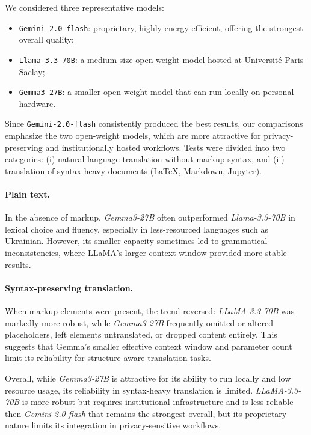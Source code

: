 \documentclass[runningheads]{llncs}
\begin{document}
We considered three representative models:
\begin{itemize}
    \item \texttt{Gemini-2.0-flash}: proprietary, highly energy-efficient,
    offering the strongest overall quality;
    \item \texttt{Llama-3.3-70B}: a medium-size open-weight model hosted at
    Université Paris-Saclay;
    \item \texttt{Gemma3-27B}: a smaller open-weight model that can run locally
    on personal hardware.
\end{itemize}

Since \texttt{Gemini-2.0-flash} consistently produced the best results, our
comparisons emphasize the two open-weight models, which are more attractive for
privacy-preserving and institutionally hosted workflows. Tests were divided
into two categories: (i) natural language translation without markup syntax,
and (ii) translation of syntax-heavy documents (LaTeX, Markdown, Jupyter).

\paragraph{Plain text.}
In the absence of markup, \textit{Gemma3-27B} often outperformed
\textit{Llama-3.3-70B} in lexical choice and fluency, especially in
less-resourced languages such as Ukrainian. However, its smaller capacity
sometimes led to grammatical inconsistencies, where LLaMA’s larger context
window provided more stable results.

\paragraph{Syntax-preserving translation.}
When markup elements were present, the trend reversed: \textit{LLaMA-3.3-70B}
was markedly more robust, while \textit{Gemma3-27B} frequently omitted or
altered placeholders, left elements untranslated, or dropped content entirely.
This suggests that Gemma’s smaller effective context window and parameter count
limit its reliability for structure-aware translation tasks.

Overall, while \textit{Gemma3-27B} is attractive for its ability to run locally
and low resource usage, its reliability in syntax-heavy translation is limited.
\textit{LLaMA-3.3-70B} is more robust but requires institutional infrastructure
and is less reliable then \textit{Gemini-2.0-flash} that remains the strongest
overall, but its proprietary nature limits its integration in privacy-sensitive
workflows.
\end{document}
